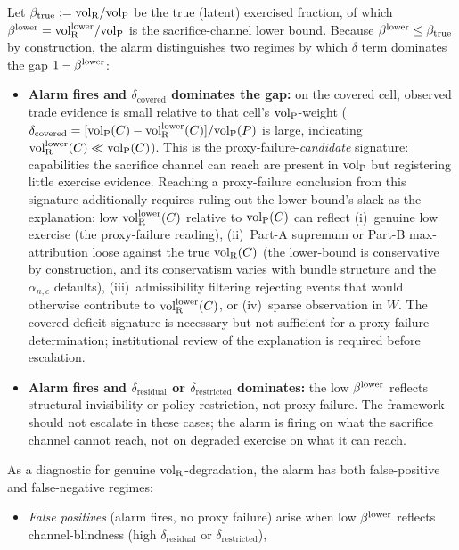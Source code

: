 \begin{remark}
\label{rem:alarm_interpretation}
Let $\beta_{\mathrm{true}} := {\operatorname{vol}_{\mathrm{R}}}/{\operatorname{vol}_{\mathrm{P}}}$ be the true (latent) exercised
fraction, of which $\beta^{\mathrm{lower}} = {\operatorname{vol}_{\mathrm{R}}^{\mathrm{lower}}}/{\operatorname{vol}_{\mathrm{P}}}$ is the
sacrifice-channel lower bound.  Because $\beta^{\mathrm{lower}} \leq \beta_{\mathrm{true}}$
by construction, the alarm distinguishes two regimes by which
$\delta$ term dominates the gap $1 - \beta^{\mathrm{lower}}$:
\begin{itemize}
\item \textbf{Alarm fires and $\delta_{\mathrm{covered}}$
  dominates the gap:} on the covered cell, observed trade
  evidence is small relative to that cell's ${\operatorname{vol}_{\mathrm{P}}}$-weight
  ($\delta_{\mathrm{covered}} = [{\operatorname{vol}_{\mathrm{P}}}(C) - {\operatorname{vol}_{\mathrm{R}}^{\mathrm{lower}}}(C)] /
  {\operatorname{vol}_{\mathrm{P}}}(P)$ is large, indicating
  ${\operatorname{vol}_{\mathrm{R}}^{\mathrm{lower}}}(C) \ll {\operatorname{vol}_{\mathrm{P}}}(C)$).  This is the
  proxy-failure-\emph{candidate} signature: capabilities the
  sacrifice channel can reach are present in ${\operatorname{vol}_{\mathrm{P}}}$ but
  registering little exercise evidence.  Reaching a
  proxy-failure conclusion from this signature additionally
  requires ruling out the lower-bound's slack as the
  explanation: low ${\operatorname{vol}_{\mathrm{R}}^{\mathrm{lower}}}(C)$ relative to ${\operatorname{vol}_{\mathrm{P}}}(C)$ can
  reflect (i)~genuine low exercise (the proxy-failure
  reading), (ii)~Part-A supremum or Part-B max-attribution
  loose against the true ${\operatorname{vol}_{\mathrm{R}}}(C)$ (the lower-bound is
  conservative by construction, and its conservatism varies
  with bundle structure and the $\alpha_{n,c}$ defaults),
  (iii)~admissibility filtering rejecting events that would
  otherwise contribute to ${\operatorname{vol}_{\mathrm{R}}^{\mathrm{lower}}}(C)$, or (iv)~sparse
  observation in $W$.  The covered-deficit signature is
  necessary but not sufficient for a proxy-failure
  determination; institutional review of the explanation
  is required before escalation.
\item \textbf{Alarm fires and $\delta_{\mathrm{residual}}$ or
  $\delta_{\mathrm{restricted}}$ dominates:} the low $\beta^{\mathrm{lower}}$
  reflects structural invisibility or policy restriction, not
  proxy failure.  The framework should not escalate in these
  cases; the alarm is firing on what the sacrifice channel cannot
  reach, not on degraded exercise on what it can reach.
\end{itemize}
As a diagnostic for genuine
${\operatorname{vol}_{\mathrm{R}}}$-degradation, the alarm has both
false-positive and false-negative regimes:
\begin{itemize}
\item \emph{False positives} (alarm fires, no proxy failure)
  arise when low $\beta^{\mathrm{lower}}$ reflects channel-blindness (high
  $\delta_{\mathrm{residual}}$ or $\delta_{\mathrm{restricted}}$),

\end{itemize}
\end{remark}

